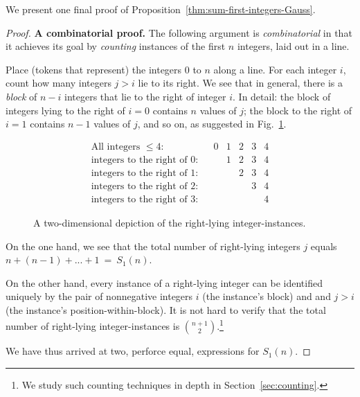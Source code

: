 \medskip

We present one final proof of
Proposition~\ref{thm:sum-first-integers-Gauss}.

\begin{proof}
{\bf A combinatorial proof.}
%
The following argument is {\it combinatorial} in that it achieves its
goal by {\em counting} instances of the first $n$ integers, laid out
in a line.

Place (tokens that represent) the integers $0$ to $n$ along a line.
For each integer $i$, count how many integers $j > i$ lie to its
right.  We see that in general, there is a {\it block} of $n-i$
integers that lie to the right of integer $i$.  In detail: the block
of integers lying to the right of $i=0$ contains $n$ values of $j$;
the block to the right of $i=1$ contains $n-1$ values of $j$, and so
on, as suggested in Fig.~\ref{fig:rightward-instances}.

\begin{figure}[htb]
\[
\begin{array}{lcccccc}
\mbox{All integers $\leq 4$:} &
 & 0 & 1 & 2 & 3 & 4 \\
\mbox{integers to the right of $0$:} &
 &   & 1 & 2 & 3 & 4 \\
\mbox{integers to the right of $1$:} &
 &   &   & 2 & 3 & 4 \\
\mbox{integers to the right of $2$:} &
 &   &   &   & 3 & 4 \\
\mbox{integers to the right of $3$:} &
 &   &   &   &   & 4
\end{array}
\]
\caption{A two-dimensional depiction of the right-lying
  integer-instances.}
\label{fig:rightward-instances}
\end{figure}

On the one hand, we see that the total number of right-lying integers
$j$ equals $n+(n-1)+ ... + 1 \ = \ S_1(n)$.

On the other hand, every instance of a right-lying integer can be
identified uniquely by the pair of nonnegative integers $i$ (the
instance's block) and and $j>i$ (the instance's
position-within-block).  It is not hard to verify that the total
number of right-lying integer-instances is
$\displaystyle {n+1 \choose 2}$.\footnote{We study such counting
  techniques in depth in Section~\ref{sec:counting}.}

We have thus arrived at two, perforce equal, expressions for $S_1(n)$.
\end{proof}


